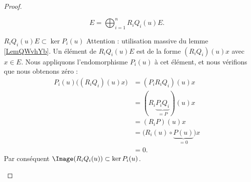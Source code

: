 \begin{proof}
\begin{subproof}
    \begin{equation}        \label{EQooJPQLooOZepwZ}
        E=\bigoplus_{i=1}^nR_iQ_i(u)E.
    \end{equation}
\item[\( R_iQ_i(u)E\subset \ker P_i(u)\)]
    Attention : utilisation massive du lemme \ref{LemQWvhYb}. Un élément de \( R_iQ_i(u)E\) est de la forme \( (R_iQ_i)(u)x\) avec \( x\in E\). Nous appliquons l'endomorphisme \( P_i(u)\) à cet élément, et nous vérifions que nous obtenons zéro :
    \begin{subequations}
        \begin{align}
            P_i(u)\big( (R_iQ_i)(u)x \big)&=(P_iR_iQ_i)(u)x\\
            &=(R_i\underbrace{P_iQ_i}_{=P})(u)x\\
            &=(R_iP)(u)x\\
            &=\big( R_i(u)\circ \underbrace{P(u)}_{=0}\big)x\\
            &=0.
        \end{align}
    \end{subequations}
    Par conséquent \( \Image(R_iQ_i(u))\subset \ker P_i(u)\). 



\end{subproof}
\end{proof}
